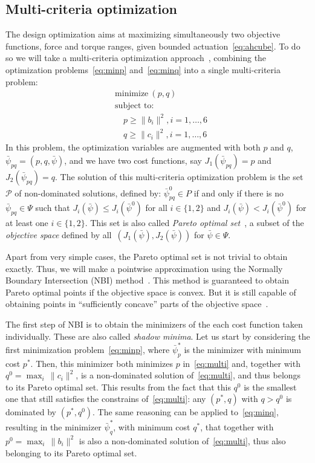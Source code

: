 \subsection{Multi-criteria optimization}
\label{sec:multi-crit-optim}

The design optimization aims at maximizing simultaneously two
objective functions, force and torque ranges, given bounded
actuation~\eqref{eq:ahcube}. To do so we will take a multi-criteria
optimization approach~\cite{statnikov95}, combining the
optimization problems~\eqref{eq:minp}
and~\eqref{eq:minq} into a single multi-criteria problem:
\begin{equation}
  \label{eq:multi}
  \begin{split}
    &\text{minimize}\:(p, q) \\
    &\text{subject to:} \\
    &\quad p \geq \|b_i\|^2, i=1,\ldots,6 \\
    &\quad q \geq \|c_i\|^2, i=1,\ldots,6
  \end{split}
\end{equation}
In this problem, the optimization variables are augmented with both
$p$ and $q$, $\bar{\psi}_{pq}=(p, q, \bar{\psi})$, and we have two
cost functions, say $J_1(\bar{\psi}_{pq})=p$ and
$J_2(\bar{\psi}_{pq})=q$. The solution of this multi-criteria
optimization problem is the set $\mathcal{P}$ of non-dominated
solutions, defined by: $\bar{\psi}_{pq}^0\in P$ if and only if there is no
$\bar{\psi}_{pq}\in\Psi$ such that
$J_i(\bar{\psi})\leq J_i(\bar{\psi}^0)$ for all $i\in\{1,2\}$ and
$J_i(\bar{\psi})< J_i(\bar{\psi}^0)$ for at least one
$i\in\{1,2\}$. This set is also called \emph{Pareto optimal
  set}~\cite{statnikov95}, a subset of the \emph{objective space}
defined by all~$(J_1(\bar{\psi}),J_2(\bar{\psi}))$ for
$\bar{\psi}\in\Psi$.

Apart from very simple cases, the Pareto optimal set is not trivial to
obtain exactly. Thus, we will make a pointwise approximation using the
Normally Boundary Intersection (NBI) method~\cite{das98}. This method
is guaranteed to obtain Pareto optimal points if the objective space
is convex. But it is still capable of obtaining points in ``sufficiently
concave'' parts of the objective space~\cite{das98}.

The first step of NBI is to obtain the minimizers of the each cost
function taken individually. These are also called \emph{shadow
  minima}. Let us start by considering the first minimization
problem~\eqref{eq:minp}, where $\bar{\psi}^*_p$ is the minimizer with
minimum cost $p^*$.  Then, this minimizer both minimizes $p$
in~\eqref{eq:multi} and, together with $q^0=\max_i\,\|c_i\|^2$, is a
non-dominated solution of~\eqref{eq:multi}, and thus belongs to its
Pareto optimal set. This results from the fact that this $q^0$ is the
smallest one that still satisfies the constrains of~\eqref{eq:multi}:
any $(p^*,q)$ with $q>q^0$ is dominated by $(p^*,q^0)$.  The same
reasoning can be applied to~\eqref{eq:minq}, resulting in the
minimizer $\bar{\psi}^*_q$, with minimum cost $q^*$, that together
with $p^0=\max_i\,\|b_i\|^2$ is also a non-dominated solution
of~\eqref{eq:multi}, thus also belonging to its Pareto optimal set.

